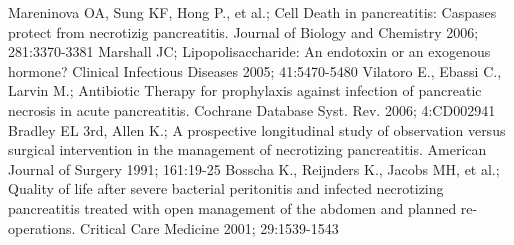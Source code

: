 \documentclass[a4paper, 12pt]{report}
\begin{document}
\begin{thebibliography}{99}
 Mareninova OA, Sung KF, Hong P., et al.; Cell Death in
  pancreatitis: Caspases protect from necrotizig pancreatitis. Journal
  of Biology and Chemistry 2006; 281:3370-3381
 Marshall JC; Lipopolisaccharide: An endotoxin or an
  exogenous hormone? Clinical Infectious Diseases 2005; 41:5470-5480
 Vilatoro E., Ebassi C., Larvin M.; Antibiotic Therapy for
  prophylaxis against infection of pancreatic necrosis in acute
  pancreatitis. Cochrane Database Syst. Rev. 2006; 4:CD002941
 Bradley EL 3rd, Allen K.; A prospective longitudinal
  study of observation versus surgical intervention in the management
  of necrotizing pancreatitis. American Journal of Surgery 1991; 161:19-25
 Bosscha K., Reijnders K., Jacobs MH, et al.; Quality of
  life after severe bacterial peritonitis and infected necrotizing
  pancreatitis treated with open management of the abdomen and planned
  re-operations. Critical Care Medicine 2001; 29:1539-1543
\end{thebibliography}
\end{document}
